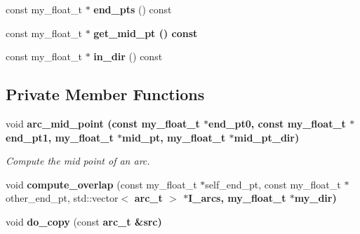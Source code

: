 \begin{CompactItemize}
\item 
const my\_\-float\_\-t $\ast$ \textbf{end\_\-pts} () const \label{classSimSite3D_1_1geometry_1_1arc__t_1aa54d4a368b5f54286d5b1a2694da6e}

\item 
const my\_\-float\_\-t $\ast$ \bf{get\_\-mid\_\-pt} () const 
\item 
const my\_\-float\_\-t $\ast$ \textbf{in\_\-dir} () const \label{classSimSite3D_1_1geometry_1_1arc__t_6d0b6a1eaa18fda15db3053be0a6c6f6}

\end{CompactItemize}
\subsection*{Private Member Functions}
\begin{CompactItemize}
\item 
void \bf{arc\_\-mid\_\-point} (const my\_\-float\_\-t $\ast$end\_\-pt0, const my\_\-float\_\-t $\ast$end\_\-pt1, my\_\-float\_\-t $\ast$mid\_\-pt, my\_\-float\_\-t $\ast$mid\_\-pt\_\-dir)\label{classSimSite3D_1_1geometry_1_1arc__t_bf87d7083d0b036b8aa49a8f76091462}

\begin{CompactList}\small\item\em Compute the mid point of an arc. \item\end{CompactList}\item 
void \textbf{compute\_\-overlap} (const my\_\-float\_\-t $\ast$self\_\-end\_\-pt, const my\_\-float\_\-t $\ast$other\_\-end\_\-pt, std::vector$<$ \bf{arc\_\-t} $>$ $\ast$I\_\-arcs, my\_\-float\_\-t $\ast$my\_\-dir)\label{classSimSite3D_1_1geometry_1_1arc__t_ec22f353635ed13d58a1f0eacd704ffd}

\item 
void \textbf{do\_\-copy} (const \bf{arc\_\-t} \&src)\label{classSimSite3D_1_1geometry_1_1arc__t_c999379b32c2d80997fd5cdb3503693f}

\end{CompactItemize}
